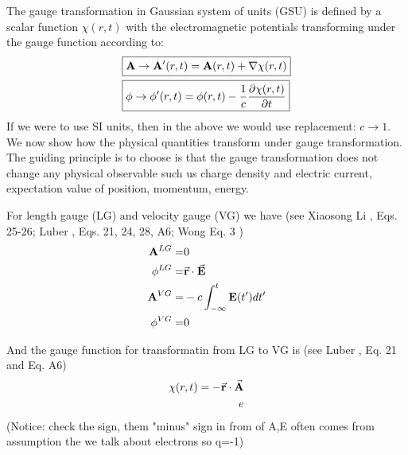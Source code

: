 \documentclass[11pt]{article}
\begin{document}
The  gauge transformation in Gaussian system of units  (GSU) is defined by a scalar function $\chi(r,t)$  with  the electromagnetic potentials transforming under the gauge function according to:
\begin{align}
    &\label{eq:gauge_rule_vector_pot} 
    \boxed{ \vb A \to \vb A'(r,t)= \vb A(r,t) + \nabla \chi(r,t) } \\
    &\label{eq:gauge_rule_scalar_pot} 
    \boxed{ \phi \to \phi'(r,t) = \phi(r,t) -\frac{1}{c} \pdv{\chi(r,t)}{t} }
\end{align}
If we were to use SI units, then in the above  we would use replacement: $c\to 1$.
We now show how the  physical quantities  transform under gauge transformation. The guiding principle is to choose is  that the gauge transformation does not change any physical  observable such us charge density and electric current, expectation value of position, momentum, energy.




For length gauge (LG) and velocity gauge (VG) we  have (see Xiaosong Li \cite{Xiaosong-Li-2011-gauge}, Eqs. 25-26;   Luber \cite{Luber-rt-tddft}, Eqs. 21, 24, 28, A6; Wong   \cite{rt-DFTB-Wong-2023} Eq. 3 )
\begin{align*}
    \vb  A^{LG} = &  0 \\
    \phi^{LG}   = & \vec{ \vb r} \cdot \vec{\vb E} \\
    \vb  A^{VG} = &  -c \int_{-\infty}^{t}  \vb E(t') dt' \\
    \phi^{VG}   = & 0
\end{align*}


And the gauge function for transformatin from LG to VG is (see  Luber \cite{Luber-rt-tddft}, Eq. 21 and Eq. A6)
\begin{align*}
\chi(r,t) = -  \vec{ \vb r} \cdot \vec{\vb A} \\
e
\end{align*}
(Notice: check the sign,  them  "minus" sign in from of A,E often comes from assumption  the we talk about electrons so  q=-1)     




\end{document}
